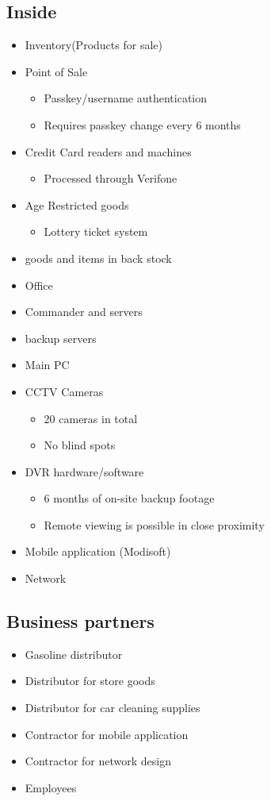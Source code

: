 \documentclass[11pt]{article}
\begin{document}
\subsection{Inside}
\label{sec:org419d619}
\begin{itemize}
\item Inventory(Products for sale)
\item Point of Sale
\begin{itemize}
\item Passkey/username authentication
\item Requires passkey change every 6 months
\end{itemize}
\item Credit Card readers and machines
\begin{itemize}
\item Processed through Verifone
\end{itemize}
\item Age Restricted goods
\begin{itemize}
\item Lottery ticket system
\end{itemize}
\item goods and items in back stock
\item Office
\item Commander and servers
\item backup servers
\item Main PC
\item CCTV Cameras
\begin{itemize}
\item 20 cameras in total
\item No blind spots
\end{itemize}
\item DVR hardware/software
\begin{itemize}
\item 6 months of on-site backup footage
\item Remote viewing is possible in close proximity
\end{itemize}
\item Mobile application (Modisoft)
\item Network
\end{itemize}
\subsection{Business partners}
\label{sec:org4b05e84}
\begin{itemize}
\item Gasoline distributor
\item Distributor for store goods
\item Distributor for car cleaning supplies
\item Contractor for mobile application
\item Contractor for network design
\item Employees
\end{itemize}
\end{document}
